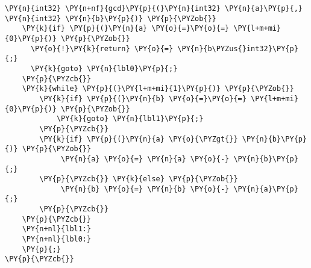 \begin{Verbatim}[commandchars=\\\{\}]
\PY{n}{int32} \PY{n+nf}{gcd}\PY{p}{(}\PY{n}{int32} \PY{n}{a}\PY{p}{,} \PY{n}{int32} \PY{n}{b}\PY{p}{)} \PY{p}{\PYZob{}}
    \PY{k}{if} \PY{p}{(}\PY{n}{a} \PY{o}{=}\PY{o}{=} \PY{l+m+mi}{0}\PY{p}{)} \PY{p}{\PYZob{}}
      \PY{o}{!}\PY{k}{return} \PY{o}{=} \PY{n}{b\PYZus{}int32}\PY{p}{;}
      \PY{k}{goto} \PY{n}{lbl0}\PY{p}{;}
    \PY{p}{\PYZcb{}}
    \PY{k}{while} \PY{p}{(}\PY{l+m+mi}{1}\PY{p}{)} \PY{p}{\PYZob{}}
        \PY{k}{if} \PY{p}{(}\PY{n}{b} \PY{o}{=}\PY{o}{=} \PY{l+m+mi}{0}\PY{p}{)} \PY{p}{\PYZob{}}
            \PY{k}{goto} \PY{n}{lbl1}\PY{p}{;}
        \PY{p}{\PYZcb{}}
        \PY{k}{if} \PY{p}{(}\PY{n}{a} \PY{o}{\PYZgt{}} \PY{n}{b}\PY{p}{)} \PY{p}{\PYZob{}}
             \PY{n}{a} \PY{o}{=} \PY{n}{a} \PY{o}{-} \PY{n}{b}\PY{p}{;}
        \PY{p}{\PYZcb{}} \PY{k}{else} \PY{p}{\PYZob{}}
             \PY{n}{b} \PY{o}{=} \PY{n}{b} \PY{o}{-} \PY{n}{a}\PY{p}{;}
        \PY{p}{\PYZcb{}}
    \PY{p}{\PYZcb{}}
    \PY{n+nl}{lbl1:}
    \PY{n+nl}{lbl0:}
    \PY{p}{;}
\PY{p}{\PYZcb{}}
\end{Verbatim}
